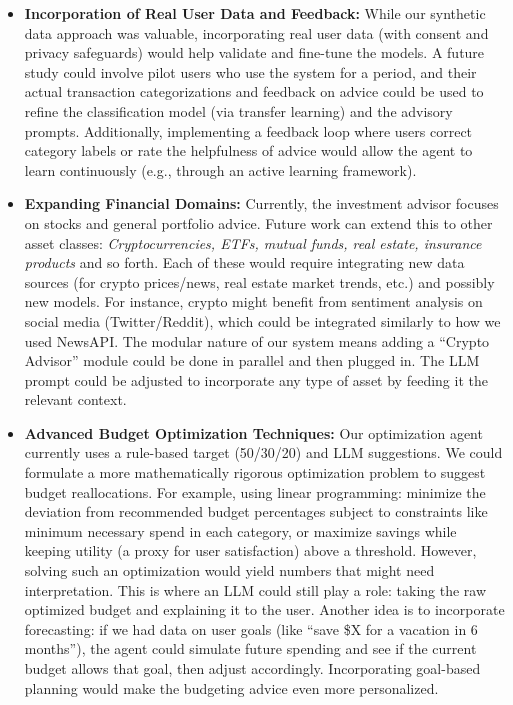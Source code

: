 \documentclass{scrartcl}
\begin{document}
\begin{itemize}
    \item \textbf{Incorporation of Real User Data and Feedback:} While our synthetic data approach was valuable, incorporating real user data (with consent and privacy safeguards) would help validate and fine-tune the models. A future study could involve pilot users who use the system for a period, and their actual transaction categorizations and feedback on advice could be used to refine the classification model (via transfer learning) and the advisory prompts. Additionally, implementing a feedback loop where users correct category labels or rate the helpfulness of advice would allow the agent to learn continuously (e.g., through an active learning framework).
    \item \textbf{Expanding Financial Domains:} Currently, the investment advisor focuses on stocks and general portfolio advice. Future work can extend this to other asset classes: \textit{Cryptocurrencies, ETFs, mutual funds, real estate, insurance products} and so forth. Each of these would require integrating new data sources (for crypto prices/news, real estate market trends, etc.) and possibly new models. For instance, crypto might benefit from sentiment analysis on social media (Twitter/Reddit), which could be integrated similarly to how we used NewsAPI. The modular nature of our system means adding a “Crypto Advisor” module could be done in parallel and then plugged in. The LLM prompt could be adjusted to incorporate any type of asset by feeding it the relevant context.
    \item \textbf{Advanced Budget Optimization Techniques:} Our optimization agent currently uses a rule-based target (50/30/20) and LLM suggestions. We could formulate a more mathematically rigorous optimization problem to suggest budget reallocations. For example, using linear programming: minimize the deviation from recommended budget percentages subject to constraints like minimum necessary spend in each category, or maximize savings while keeping utility (a proxy for user satisfaction) above a threshold. However, solving such an optimization would yield numbers that might need interpretation. This is where an LLM could still play a role: taking the raw optimized budget and explaining it to the user. Another idea is to incorporate forecasting: if we had data on user goals (like “save \$X for a vacation in 6 months”), the agent could simulate future spending and see if the current budget allows that goal, then adjust accordingly. Incorporating goal-based planning would make the budgeting advice even more personalized.

\end{itemize}
\end{document}
